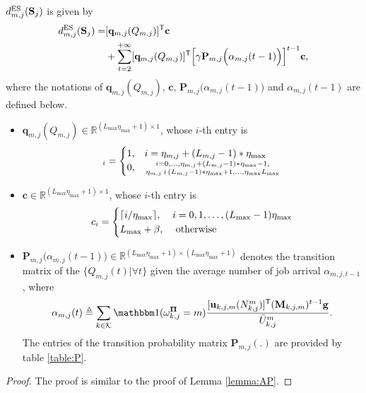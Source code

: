 \begin{lemma}
    \label{lemma:ES}
    ${d}_{m,j}^{\text{ES}}(\mathbf{S}_j)$ is given by
    \begin{align}
    {d}_{m,j}^{\text{ES}}(\mathbf{S}_j)=&[\mathbf{q}_{m,j}(Q_{m,j})]^{\mathsf{T}}\mathbf{c}\nonumber\\
    &+\sum_{t=2}^{+\infty}[\mathbf{q}_{m,j}(Q_{m,j})]^{\mathsf{T}}\Big[\gamma\mathbf{P}_{m,j}\Big(\alpha_{m,j}(t-1)\Big)\Big]^{t-1}\mathbf{c},
    \end{align}
    where the notations of $\mathbf{q}_{m,j}({Q}_{m,j})$,  $\mathbf{c}$, $\mathbf{P}_{m,j}\Big(\alpha_{m,j}(t-1)\Big)$ and $\alpha_{m,j}(t-1)$ are defined below.
    \begin{itemize}
        \item $\mathbf{q}_{m,j}({Q}_{m,j})\in \mathbb{R}^{(L_{{\max}}\eta_{{\max}}+1)\times1}$, whose $i$-th entry is 
            \begin{align}
        [\mathbf{q}_{m,j}({Q}_{m,j})]_{i}=\begin{cases}
        1, & i=\eta_{m,j}+(L_{m,j}-1)*\eta_{{\max}}
        \cr
    0, & 
            i=0,\dots,\eta_{m,j}+(L_{m,j}-1)*\eta_{{\max}}-1,\atop\eta_{m,j}+(L_{m,j}-1)*\eta_{{\max}}+1,\dots,\eta_{{\max}}L_{{\max}}
        \end{cases}
        \end{align}
        \item $\mathbf{c}\in \mathbb{R}^{(L_{{\max}}\eta_{{\max}}+1)\times1}$,  whose $i$-th entry is 
        \begin{align}
        c_{i}=\begin{cases}
        \lceil i/\eta_{{\max}}\rceil, & i=0,1,\dots,(L_{{\max}}-1)\eta_{{\max}}
        \cr
        L_{{\max}}+\beta, & \text{ otherwise}
        \end{cases}
        \end{align}
        \item $\mathbf{P}_{m,j}\Big(\alpha_{m,j}(t-1)\Big)\in\mathbb{R}^{(L_{{\max}}\eta_{{\max}}+1)\times(L_{{\max}}\eta_{{\max}}+1)}$ denotes the transition matrix of the $\{Q_{m,j}(t)|\forall t\}$ given the average number of job arrival $\alpha_{m,j,t-1}$, where
        \begin{align}
        \alpha_{m,j}(t)\triangleq\sum_{k\in\apSet} \indicator(\omega_{k,j}^{\Baseline}=m)\frac{[\mathbf{u}_{k,j,m}(N_{k,j}^m)]^{\mathsf{T}}(\mathbf{M}_{k,j,m})^{t-1}\mathbf{g}}{\bar{U}_{k,j}^m}.
        \end{align}
        The entries of the transition probability matrix $\mathbf{P}_{m,j}(.)$ are provided by table \ref{table:P}.
    \end{itemize}
\end{lemma}
\begin{proof}
    The proof is similar to the proof of Lemma \ref{lemma:AP}.
\end{proof}


